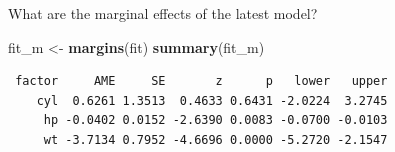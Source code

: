 \documentclass[australian,ignorenonframetext,aspectratio=169]{beamer}
\newenvironment{Shaded}{\begin{snugshade}}{\end{snugshade}}
\newcommand{\KeywordTok}[1]{\textcolor[rgb]{0.13,0.29,0.53}{\textbf{#1}}}
\newcommand{\NormalTok}[1]{#1}
\newcommand{\StringTok}[1]{\textcolor[rgb]{0.31,0.60,0.02}{#1}}
\begin{document}
\begin{frame}[fragile]{What are the marginal effects of the latest
model?}
\protect\hypertarget{what-are-the-marginal-effects-of-the-latest-model}{}

\begin{Shaded}
\begin{Highlighting}[]
\NormalTok{fit\_m \textless{}{-}}\StringTok{ }\KeywordTok{margins}\NormalTok{(fit)}
\KeywordTok{summary}\NormalTok{(fit\_m)}
\end{Highlighting}
\end{Shaded}

\begin{verbatim}
 factor     AME     SE       z      p   lower   upper
    cyl  0.6261 1.3513  0.4633 0.6431 -2.0224  3.2745
     hp -0.0402 0.0152 -2.6390 0.0083 -0.0700 -0.0103
     wt -3.7134 0.7952 -4.6696 0.0000 -5.2720 -2.1547
\end{verbatim}

\end{frame}
\end{document}
